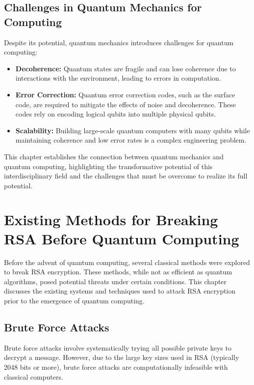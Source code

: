 \documentclass[12pt,a4paper]{report}
\begin{document}
\section{Challenges in Quantum Mechanics for Computing}
Despite its potential, quantum mechanics introduces challenges for quantum computing:
\begin{itemize}
    \item \textbf{Decoherence:} Quantum states are fragile and can lose coherence due to interactions with the environment, leading to errors in computation.
    \item \textbf{Error Correction:} Quantum error correction codes, such as the surface code, are required to mitigate the effects of noise and decoherence. These codes rely on encoding logical qubits into multiple physical qubits.
    \item \textbf{Scalability:} Building large-scale quantum computers with many qubits while maintaining coherence and low error rates is a complex engineering problem.
\end{itemize}

This chapter establishes the connection between quantum mechanics and quantum computing, highlighting the transformative potential of this interdisciplinary field and the challenges that must be overcome to realize its full potential.

\chapter{Existing Methods for Breaking RSA Before Quantum Computing}
Before the advent of quantum computing, several classical methods were explored to break RSA encryption. These methods, while not as efficient as quantum algorithms, posed potential threats under certain conditions. This chapter discusses the existing systems and techniques used to attack RSA encryption prior to the emergence of quantum computing.

\section{Brute Force Attacks}
Brute force attacks involve systematically trying all possible private keys to decrypt a message. However, due to the large key sizes used in RSA (typically 2048 bits or more), brute force attacks are computationally infeasible with classical computers.
\end{document}
